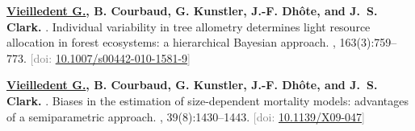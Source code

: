 \documentclass[10pt,a4paper,sans]{moderncv}
\newcounter{enumiv_gv}
\begin{document}
\begin{thebibliography}{10}
\setcounter{enumiv}{1}
\textbf{\underline{Vieilledent G.}, B. Courbaud, G. Kunstler, J.-F. Dhôte, and J.~S. Clark.}
.
\newblock Individual variability in tree allometry determines light resource
  allocation in forest ecosystems: a hierarchical Bayesian approach.
, 163(3):759--773.
\newblock \textcolor{gray}{[doi: \href{http://dx.doi.org/10.1007/s00442-010-1581-9}{10.1007/s00442-010-1581-9}]}

\setcounter{enumiv}{0}
\textbf{\underline{Vieilledent G.}, B. Courbaud, G. Kunstler, J.-F. Dhôte, and J.~S. Clark.}
.
\newblock Biases in the estimation of size-dependent mortality models: advantages of a semiparametric approach.
, 39(8):1430--1443.
\newblock \textcolor{gray}{[doi: \href{http://dx.doi.org/10.1139/X09-047}{10.1139/X09-047}]}

\end{thebibliography}




\end{document}
